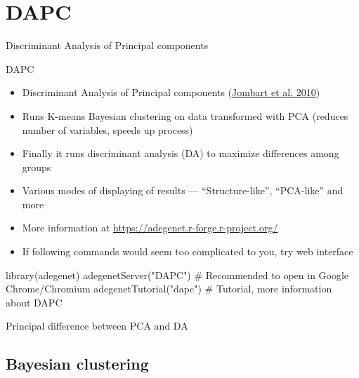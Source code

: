 \documentclass[compress, ucs, xelatex, 11pt, xcolor=svgnames, aspectratio=169,
	hyperref={
		bookmarks=true,
		unicode=true,
		colorlinks=true,
		pdftitle={Molecular data in R},
		plainpages=false,
		pdfauthor={Vojtech Zeisek},
		pdfsubject={Course about phylogeny and evolution in R},
		pdfcreator={XeLaTeX},
		pdfkeywords={R, evolution, phylogeny, molecular data},
		linkcolor=Crimson, %
		anchorcolor=Magenta, %
		citecolor=Magenta, %
		filecolor=Magenta, %
		menucolor=Magenta, %
		urlcolor=DodgerBlue, %
		pdftex},
	url={hyphens, lowtilde} %
	]{beamer}
\renewcommand{\texttt}[1]{\colorbox{Beige}{{\ttfamily #1}}}
\begin{document}
\section{DAPC}

\begin{frame}{Discriminant Analysis of Principal components}
	\tableofcontents[currentsection, sectionstyle=show/hide, hideothersubsections]
\end{frame}

\begin{frame}[fragile]{DAPC}
	\label{DAPC}
	\begin{itemize}
		\item Discriminant Analysis of Principal components (\href{https://bmcgenet.biomedcentral.com/articles/10.1186/1471-2156-11-94}{Jombart et al. 2010})
		\item Runs K-means Bayesian clustering on data transformed with PCA (reduces number of variables, speeds up process)
		\item Finally it runs discriminant analysis (DA) to maximize differences among groups
		\item Various modes of displaying of results --- \enquote{Structure-like}, \enquote{PCA-like} and more
		\item More information at \url{https://adegenet.r-forge.r-project.org/}
		\item If following commands would seem too complicated to you, try web interface
	\end{itemize}
	\begin{spluscode}
    library(adegenet)
    adegenetServer("DAPC") # Recommended to open in Google Chrome/Chromium
    adegenetTutorial("dapc") # Tutorial, more information about DAPC
	\end{spluscode}
\end{frame}

\begin{frame}{Principal difference between PCA and DA}
	\begin{center}
		\texttt{[image: dapc-da-pca.png]}
	\end{center}
\end{frame}

\subsection{Bayesian clustering}
\end{document}
